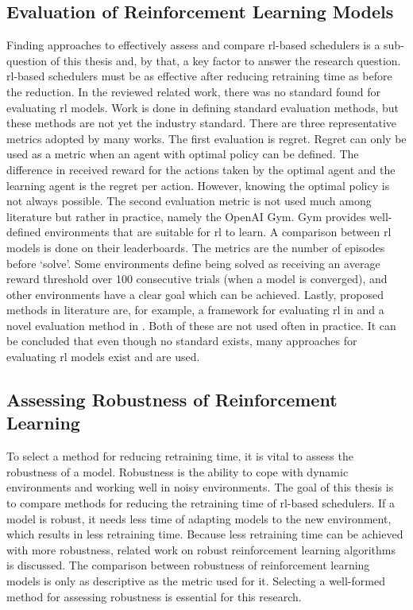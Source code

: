 


\subsection{Evaluation of Reinforcement Learning Models}\label{sec:evaluation}

Finding approaches to effectively assess and compare \gls{rl}-based schedulers is a
sub-question of this thesis and, by that, a key factor to answer the research
question. \gls{rl}-based schedulers must be as effective after reducing retraining
time as before the reduction. In the reviewed related work, there was no
standard found for evaluating \gls{rl} models. Work is done in defining standard
evaluation methods, but these methods are not yet the industry standard. There
are three representative metrics adopted by many works. The first evaluation
is regret. Regret can only be used as a metric when an agent with optimal
policy can be defined. The difference in received reward for the actions taken
by the optimal agent and the learning agent is the regret per action. However,
knowing the optimal policy is not always possible. The second evaluation
metric is not used much among literature but rather in practice, namely the
OpenAI Gym. Gym provides well-defined environments that are suitable for
\gls{rl}
to learn. A comparison between \gls{rl} models is done on their
leaderboards. The metrics are
the number of episodes before `solve'. Some environments define being solved
as receiving an average reward threshold over 100 consecutive trials (when a
model is converged), and other environments have a clear goal which can be
achieved. Lastly, proposed methods in literature are, for example, a framework
for evaluating \gls{rl} in  and a novel evaluation method in
. Both of these are not used often in practice. It can be
concluded that even though no standard exists, many approaches for evaluating
\gls{rl} models exist and are used.


\subsection{Assessing Robustness of Reinforcement Learning}

To select a method for reducing retraining time, it is vital to assess the
robustness of a model. Robustness is the ability to cope with dynamic
environments and working well in noisy environments. The goal of this thesis is
to compare methods for reducing the retraining time of \gls{rl}-based schedulers. If
a model is robust, it needs less time of adapting models to the new
environment, which results in less retraining time. Because less
retraining time can be achieved with more robustness, related work on robust
reinforcement learning algorithms is discussed. The comparison between
robustness of reinforcement learning models is only as descriptive as the
metric used for it. Selecting a well-formed method for assessing robustness is
essential for this research.

